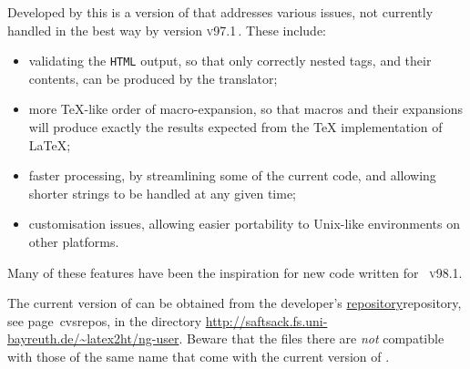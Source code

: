 \subsubsection*{\latextohtmlNG}
Developed by \Hennecke\label{latex2htmlNG} this is a version of 
\latextohtml{} that addresses various issues,
not currently handled in the best way by version \textsc{v97.1}\,.
These include:
\begin{itemize}
\item validating the \texttt{HTML} output,
so that only correctly nested tags, and their contents,
can be produced by the translator;
%
\item more \TeX-like order of macro-expansion,
so that macros and their expansions will produce exactly
the results expected from the \TeX{} implementation of \LaTeX;
%
\item faster processing,
by streamlining some of the current \Perl{} code, and allowing
shorter strings to be handled at any given time;
%
\item customisation issues,
allowing easier portability to Unix-like environments on
other platforms.
%
\end{itemize}
Many of these features have been the inspiration for new code
written for \latextohtml~\textsc{v98.1}.

\medskip\noindent
The current version of \latextohtmlNG{} can be obtained from
the developer's
\hyperref[page]{repository}{repository, see page~}{}{cvsrepos},
in the directory
\url{http://saftsack.fs.uni-bayreuth.de/~latex2ht/ng-user}.\html{\\}
Beware that the files there are \emph{not} compatible with those of the
same name that come with the current version of \latextohtml.



